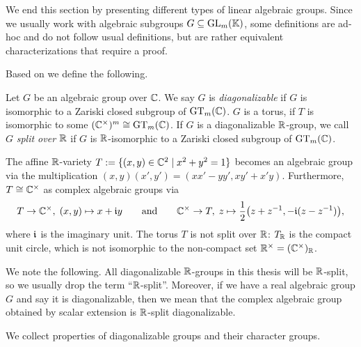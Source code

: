 We end this section by presenting different types of linear algebraic groups. Since we usually work with algebraic subgroups $G \subseteq \operatorname{GL}_m(\mathbb K)$, some definitions are ad-hoc and do not follow usual definitions, but are rather equivalent characterizations that require a proof.

Based on \cite[Propositions~8.2 and~8.4]{BorelBook} we define the following.

\begin{defn}\label{defn:DiagonalizableGroup}
	Let $G$ be an algebraic group over $\mathbb C$. We say $G$ is \emph{diagonalizable} if $G$ is isomorphic to a Zariski closed subgroup of $\operatorname{GT}_m(\mathbb C)$.
	$G$ is a torus, if $T$ is isomorphic to some $(\mathbb C^\times)^m \cong \operatorname{GT}_m(\mathbb C)$.
	If $G$ is a diagonalizable $\mathbb R$-group, we call $G$ \emph{split over $\mathbb R$} if $G$ is $\mathbb R$-isomorphic to a Zariski closed subgroup of $\operatorname{GT}_m(\mathbb C)$.
	\hfill{}
\end{defn}

\begin{example}
	The affine $\mathbb R$-variety $T := \{ (x,y) \in \mathbb C^2 \mid x^2 + y^2 = 1 \}$ becomes an algebraic group via the multiplication
	$(x,y)(x',y') = (xx' - yy', xy' + x'y)$. Furthermore, $T \cong \mathbb C^{\times}$ as complex algebraic groups via
		\[ T \to \mathbb C^\times , \; (x,y) \mapsto x+ \mathfrak{i} y \qquad \text{and} \qquad
		\mathbb C^\times \to T, \; z \mapsto \frac{1}{2} \big( z + z^{-1}, -\mathfrak{i} (z - z^{-1}) \big),	\]
	where $\mathfrak{i}$ is the imaginary unit.
	The torus $T$ is not split over $\mathbb R$: $T_\mathbb R$ is the compact unit circle, which is not isomorphic to the non-compact set $\mathbb R^\times = (\mathbb C^\times)_{\mathbb R}$. %
	\hfill\exSymbol
\end{example}

We note the following. All diagonalizable $\mathbb R$-groups in this thesis will be $\mathbb R$-split, so we usually drop the term ``$\mathbb R$-split''. Moreover, if we have a real algebraic group $G$ and say it is diagonalizable, then we mean that the complex algebraic group obtained by scalar extension is $\mathbb R$-split diagonalizable.

We collect properties of diagonalizable groups and their character groups.

